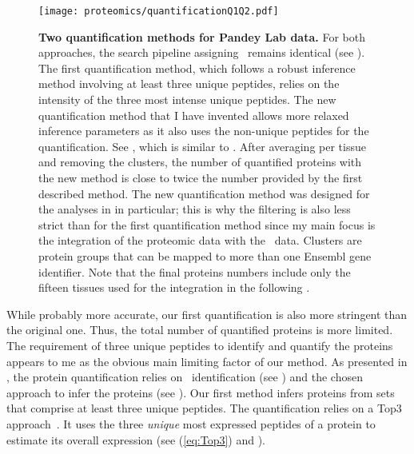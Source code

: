 \begin{figure}[!htbp]
    \texttt{[image: proteomics/quantificationQ1Q2.pdf]}\centering
    \caption[Two quantification methods for Pandey Lab data]{\label{fig:newQuantProtMeth}\textbf{Two
    quantification methods for Pandey Lab data.}
    For both approaches, the search pipeline assigning \psms\ remains identical
    (see ).
    The first quantification method,
    which follows a robust inference method
    involving at least three unique peptides,
    relies on the intensity of the three most intense unique peptides.
    The new quantification method that I have invented
    allows more relaxed inference parameters
    as it also uses the non-unique peptides for the quantification.
    See ,
    which is similar to .
    After averaging per tissue and removing the clusters,
    the number of quantified proteins with the new method
    is close to twice the number provided by the first described method.
    The new quantification method was designed
    for the analyses in  in particular;
    this is why the filtering is also less strict than for the first quantification method
    since my main focus is the integration of the proteomic data
    with the \Rnaseq\ data.
    Clusters are protein groups that can be mapped to
    more than one \gls{Ensembl} gene identifier.
    Note that the final proteins numbers include only the fifteen tissues
    used for the integration in the following .
    }
\end{figure}

While probably more accurate,
our first quantification is also more stringent than the original one.
Thus, the total number of quantified proteins is more limited.
The requirement of three unique peptides to identify and quantify the proteins
appears to me as the obvious main limiting factor of our method.
As presented in ,
the protein quantification relies on
\psms\ identification (see )
and the chosen approach to infer the proteins (see ).
Our first method infers proteins from sets that comprise at least three unique peptides.
The quantification relies on a Top3 approach~.
It uses the three \emph{unique} most expressed peptides of a protein
to estimate its overall expression
(see  (\vref{eq:Top3}) and ).\mybr\


